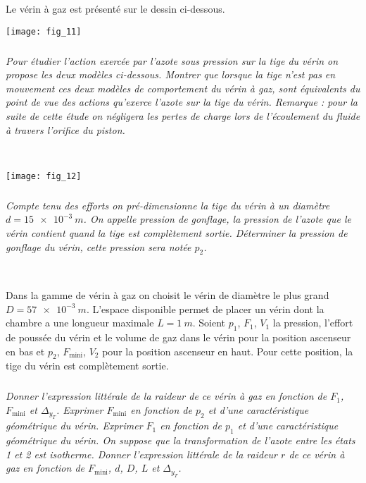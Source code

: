 \begin{multicols}{2}
Le vérin à gaz est présenté sur le dessin ci-dessous.
\begin{center}
\texttt{[image: fig\_11]}
\end{center}

\subparagraph{}\textit{Pour étudier l’action exercée par l’azote sous pression sur la tige du vérin on
propose les deux modèles ci-dessous. Montrer que lorsque la tige n’est pas
en mouvement ces deux modèles de comportement du vérin à gaz, sont équivalents
du point de vue des actions qu’exerce l’azote sur la tige du vérin.
Remarque : pour la suite de cette étude on négligera les pertes de charge lors de
l’écoulement du fluide à travers l’orifice du piston.}
\ifprof
\begin{corrige}~\\
\end{corrige}
\else
\fi


\begin{center}
\texttt{[image: fig\_12]}
\end{center}

\subparagraph{}\textit{Compte tenu des efforts on pré-dimensionne la tige du vérin à un diamètre $d=\SI{15e-3}{m}$. On appelle pression de gonflage, la pression de l’azote que le
vérin contient quand la tige est complètement sortie. Déterminer la pression de
gonflage du vérin, cette pression sera notée $p_2$.}
\ifprof
\begin{corrige}~\\
\end{corrige}
\else
\fi

Dans la gamme de vérin à gaz on choisit le vérin de diamètre le plus grand
$D=\SI{57e-3}{m}$. L’espace disponible permet de placer un vérin dont la chambre
a une longueur maximale $L=\SI{1}{m}$. Soient $p_1$, $F_1$, $V_1$ la pression,
l’effort de poussée du vérin et le volume de gaz dans le vérin pour la position
ascenseur en bas et $p_2$, $F_{\text{mini}}$, $V_2$ pour la position ascenseur en haut. Pour cette
position, la tige du vérin est complètement sortie.
\subparagraph{}\textit{Donner l’expression littérale
de la raideur de ce vérin à gaz en fonction de $F_1$, $F_{\text{mini}}$ et $\Delta_{y_T}$. Exprimer $F_{\text{mini}}$
en fonction de $p_2$ et d’une caractéristique géométrique du vérin. Exprimer $F_1$
en fonction de $p_1$ et d’une caractéristique géométrique du vérin. On suppose que
la transformation de l’azote entre les états 1 et 2 est isotherme. Donner
l’expression littérale de la raideur $r$ de ce vérin à gaz en fonction de $F_{\text{mini}}$, $d$,
$D$, $L$ et $\Delta_{y_T}$.}
\ifprof
\begin{corrige}~\\
\end{corrige}
\else
\fi


\end{multicols}
